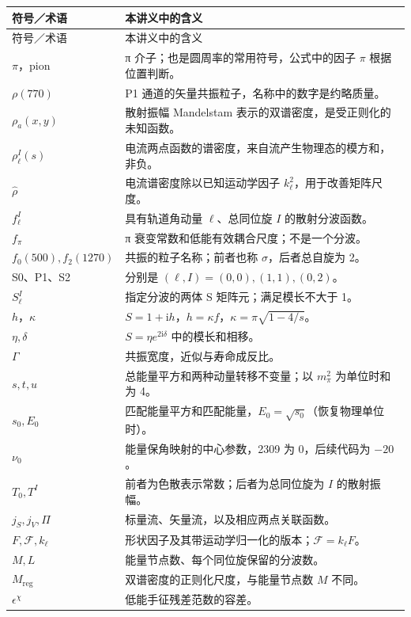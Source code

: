 \documentclass[UTF8,a4paper,11pt,fontset=fandol]{ctexart}
\numberwithin{equation}{section}
\newcommand{\ii}{\mathrm i}
\newcommand{\eChi}{\epsilon^{\chi}}
\newcommand{\Fcal}{\mathcal F}
\newcommand{\Mreg}{M_{\mathrm{reg}}}
\begin{document}
\small
\begin{longtable}{P{34mm}P{103mm}}
\toprule
符号／术语 & 本讲义中的含义\\
\midrule\endfirsthead
\toprule 符号／术语 & 本讲义中的含义\\\midrule\endhead
\bottomrule\endfoot
\(\pi\)，pion & π 介子；也是圆周率的常用符号，公式中的因子 \(\pi\) 根据位置判断。\\
\(\rho(770)\) & P1 通道的矢量共振粒子，名称中的数字是约略质量。\\
\(\rho_a(x,y)\) & 散射振幅 Mandelstam 表示的双谱密度，是受正则化的未知函数。\\
\(\rho_\ell^I(s)\) & 电流两点函数的谱密度，来自流产生物理态的模方和，非负。\\
\(\widehat\rho\) & 电流谱密度除以已知运动学因子 \(k_\ell^2\)，用于改善矩阵尺度。\\
\(f_\ell^I\) & 具有轨道角动量 \(\ell\)、总同位旋 \(I\) 的散射分波函数。\\
\(f_\pi\) & π 衰变常数和低能有效耦合尺度；不是一个分波。\\
\(f_0(500), f_2(1270)\) & 共振的粒子名称；前者也称 \(\sigma\)，后者总自旋为 2。\\
S0、P1、S2 & 分别是 \((\ell,I)=(0,0),(1,1),(0,2)\)。\\
\(S_\ell^I\) & 指定分波的两体 S 矩阵元；满足模长不大于 1。\\
\(h\)，\(\kappa\) & \(S=1+\ii h\)，\(h=\kappa f\)，\(\kappa=\pi\sqrt{1-4/s}\)。\\
\(\eta,\delta\) & \(S=\eta e^{2\ii\delta}\) 中的模长和相移。\\
\(\Gamma\) & 共振宽度，近似与寿命成反比。\\
\(s,t,u\) & 总能量平方和两种动量转移不变量；以 \(m_\pi^2\) 为单位时和为 4。\\
\(s_0,E_0\) & 匹配能量平方和匹配能量，\(E_0=\sqrt{s_0}\)（恢复物理单位时）。\\
\(\nu_0\) & 能量保角映射的中心参数，2309 为 0，后续代码为 \(-20\)。\\
\(T_0,T^I\) & 前者为色散表示常数；后者为总同位旋为 \(I\) 的散射振幅。\\
\(j_S,j_V,\Pi\) & 标量流、矢量流，以及相应两点关联函数。\\
\(F,\Fcal,k_\ell\) & 形状因子及其带运动学归一化的版本；\(\Fcal=k_\ell F\)。\\
\(M,L\) & 能量节点数、每个同位旋保留的分波数。\\
\(\Mreg\) & 双谱密度的正则化尺度，与能量节点数 \(M\) 不同。\\
\(\eChi\) & 低能手征残差范数的容差。\\

\end{longtable}
\end{document}
